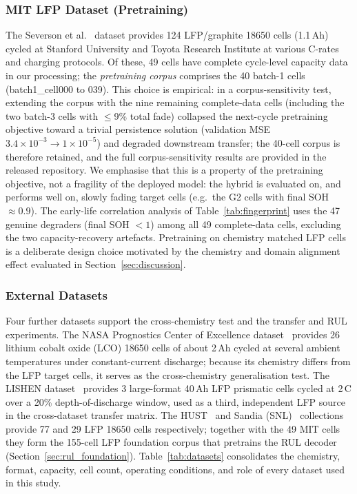 \subsubsection{MIT LFP Dataset (Pretraining)}
The Severson et al.~\cite{severson2019data} dataset provides 124 LFP/graphite
18650 cells (1.1\,Ah) cycled at Stanford University and Toyota Research
Institute at various C-rates and charging protocols.
Of these, 49 cells have complete cycle-level capacity data in our processing;
the \emph{pretraining corpus} comprises the 40 batch-1 cells
(batch1\_cell000 to 039).
This choice is empirical: in a corpus-sensitivity test, extending the corpus
with the nine remaining complete-data cells (including the two batch-3 cells
with $\leq$9\% total fade) collapsed the next-cycle pretraining objective
toward a trivial persistence solution (validation MSE
$3.4\times10^{-3}\rightarrow1\times10^{-5}$) and degraded downstream transfer;
the 40-cell corpus is therefore retained, and the full corpus-sensitivity
results are provided in the released repository.
We emphasise that this is a property of the pretraining objective, not a
fragility of the deployed model: the hybrid is evaluated on, and performs well
on, slowly fading target cells (e.g.\ the G2 cells with final SOH
${\approx}0.9$).
The early-life correlation analysis of Table~\ref{tab:fingerprint} uses the
47 genuine degraders (final SOH $<1$) among all 49 complete-data cells,
excluding the two capacity-recovery artefacts.
Pretraining on chemistry matched LFP cells is a deliberate design choice
motivated by the chemistry and domain alignment effect evaluated in
Section~\ref{sec:discussion}.

\subsubsection{External Datasets}
Four further datasets support the cross-chemistry test and the transfer and RUL
experiments. The NASA Prognostics Center of Excellence
dataset~\cite{saha2007battery} provides 26 lithium cobalt oxide (LCO) 18650
cells of about 2\,Ah cycled at several ambient temperatures under
constant-current discharge; because its chemistry differs from the LFP target
cells, it serves as the cross-chemistry generalisation test. The LISHEN
dataset~\cite{lishen_zenodo} provides 3 large-format 40\,Ah LFP prismatic cells
cycled at 2\,C over a 20\% depth-of-discharge window, used as a third,
independent LFP source in the cross-dataset transfer matrix. The HUST~\cite{ma2022real} and Sandia
(SNL)~\cite{preger2020degradation} collections provide 77 and 29 LFP 18650 cells respectively; together with
the 49 MIT cells they form the 155-cell LFP foundation corpus that pretrains the
RUL decoder (Section~\ref{sec:rul_foundation}). Table~\ref{tab:datasets}
consolidates the chemistry, format, capacity, cell count, operating conditions,
and role of every dataset used in this study.

